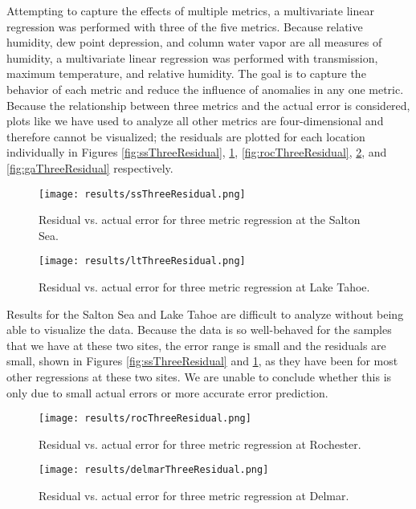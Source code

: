 \documentclass{book}
\begin{document}
Attempting to capture the effects of multiple metrics, a multivariate linear regression was performed with three of the five metrics.  Because relative humidity, dew point depression, and column water vapor are all measures of humidity, a multivariate linear regression was performed with transmission, maximum temperature, and relative humidity.  The goal is to capture the behavior of each metric and reduce the influence of anomalies in any one metric.  Because the relationship between three metrics and the actual error is considered, plots like we have used to analyze all other metrics are four-dimensional and therefore cannot be visualized; the residuals are plotted for each location individually in Figures \ref{fig:ssThreeResidual}, \ref{fig:ltThreeResidual}, \ref{fig:rocThreeResidual}, \ref{fig:delmarThreeResidual}, and \ref{fig:gaThreeResidual} respectively.

\begin{figure}[H]
\begin{minipage}[b]{0.47\textwidth}
\centering
\texttt{[image: results/ssThreeResidual.png]}
\caption{Residual vs. actual error for three metric regression at the Salton Sea.}
\label{fig:ssThreeResidual}
\end{minipage}
\begin{minipage}[b]{0.47\textwidth}
\centering
\texttt{[image: results/ltThreeResidual.png]}
\caption{Residual vs. actual error for three metric regression at Lake Tahoe.}
\label{fig:ltThreeResidual}
\end{minipage}
\end{figure}


Results for the Salton Sea and Lake Tahoe are difficult to analyze without being able to visualize the data.  Because the data is so well-behaved for the samples that we have at these two sites, the error range is small and the residuals are small, shown in Figures \ref{fig:ssThreeResidual} and \ref{fig:ltThreeResidual}, as they have been for most other regressions at these two sites.  We are unable to conclude whether this is only due to small actual errors or more accurate error prediction.

\begin{figure}[H]
\begin{minipage}[b]{0.47\textwidth}
\centering
\texttt{[image: results/rocThreeResidual.png]}
\caption{Residual vs. actual error for three metric regression at Rochester.}
\label{fig:rocThreeResidual}
\end{minipage}
\begin{minipage}[b]{0.47\textwidth}
\centering
\texttt{[image: results/delmarThreeResidual.png]}
\caption{Residual vs. actual error for three metric regression at Delmar.}
\label{fig:delmarThreeResidual}
\end{minipage}
\end{figure}
\end{document}
